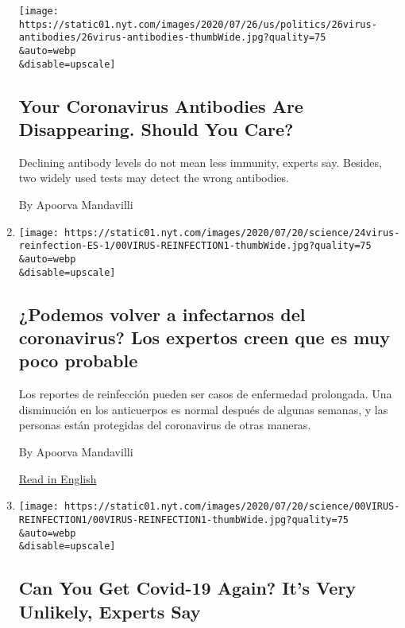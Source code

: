 \begin{enumerate}
  \texttt{[image: https://static01.nyt.com/images/2020/07/26/us/politics/26virus-antibodies/26virus-antibodies-thumbWide.jpg?quality=75\\\&auto=webp\\\&disable=upscale]}

  \hypertarget{your-coronavirus-antibodies-are-disappearing-should-you-care}{%
  \subsection{Your Coronavirus Antibodies Are Disappearing. Should You
  Care?}\label{your-coronavirus-antibodies-are-disappearing-should-you-care}}

  Declining antibody levels do not mean less immunity, experts say.
  Besides, two widely used tests may detect the wrong antibodies.

  By Apoorva Mandavilli
\item
  \href{/es/2020/07/24/espanol/ciencia-y-tecnologia/reinfeccion-coronavirus.html}{}

  \texttt{[image: https://static01.nyt.com/images/2020/07/20/science/24virus-reinfection-ES-1/00VIRUS-REINFECTION1-thumbWide.jpg?quality=75\\\&auto=webp\\\&disable=upscale]}

  \hypertarget{podemos-volver-a-infectarnos-del-coronavirus-los-expertos-creen-que-es-muy-poco-probable}{%
  \subsection{¿Podemos volver a infectarnos del coronavirus? Los
  expertos creen que es muy poco
  probable}\label{podemos-volver-a-infectarnos-del-coronavirus-los-expertos-creen-que-es-muy-poco-probable}}

  Los reportes de reinfección pueden ser casos de enfermedad prolongada.
  Una disminución en los anticuerpos es normal después de algunas
  semanas, y las personas están protegidas del coronavirus de otras
  maneras.

  By Apoorva Mandavilli

  \href{https://www.nytimes.com/2020/07/22/health/covid-antibodies-herd-immunity.html}{Read
  in English}
\item
  \href{/2020/07/22/health/covid-antibodies-herd-immunity.html}{}

  \texttt{[image: https://static01.nyt.com/images/2020/07/20/science/00VIRUS-REINFECTION1/00VIRUS-REINFECTION1-thumbWide.jpg?quality=75\\\&auto=webp\\\&disable=upscale]}

  \hypertarget{can-you-get-covid-19-again-its-very-unlikely-experts-say}{%
  \subsection{Can You Get Covid-19 Again? It's Very Unlikely, Experts
  Say}\label{can-you-get-covid-19-again-its-very-unlikely-experts-say}}


\end{enumerate}
